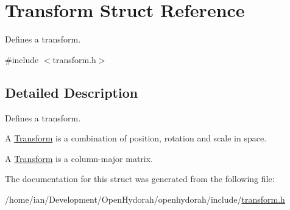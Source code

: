 \hypertarget{structTransform}{\section{Transform Struct Reference}
\label{structTransform}
}


Defines a transform.  




{\ttfamily \#include $<$transform.\-h$>$}



\subsection{Detailed Description}
Defines a transform. 

A \hyperlink{structTransform}{Transform} is a combination of position, rotation and scale in space.

A \hyperlink{structTransform}{Transform} is a column-\/major matrix. 

The documentation for this struct was generated from the following file\-:\begin{DoxyCompactItemize}
\item 
/home/ian/\-Development/\-Open\-Hydorah/openhydorah/include/\hyperlink{transform_8h}{transform.\-h}\end{DoxyCompactItemize}
